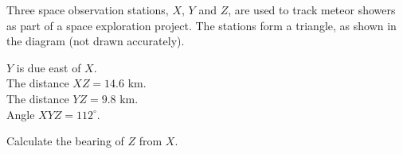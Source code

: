\begin{question}
\noindent Three space observation stations, $X$, $Y$ and $Z$, are used to track meteor showers as part of a space exploration project. The stations form a triangle, as shown in the diagram (not drawn accurately).

$Y$ is due east of $X$.\\
The distance $XZ = 14.6$ km.\\
The distance $YZ = 9.8$ km.\\
Angle $XYZ = 112^{\circ}$.

\begin{center}
\end{center}

\noindent Calculate the bearing of $Z$ from $X$.

\vspace{5cm}
\begin{flushright}
\end{flushright}
\end{question}
